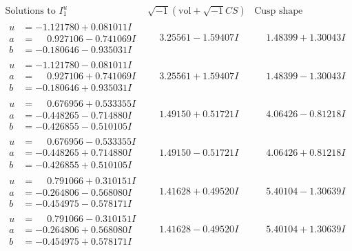 \documentclass[1p]{elsarticle_modified}
\theoremstyle{definition}
\newcommand{\I}{\sqrt{-1}}
\begin{document}
$$\begin{array}{c|c|c}  
\text{Solutions to }I^u_{1}& \I (\text{vol} + \sqrt{-1}CS) & \text{Cusp shape}\\
 \hline 
\begin{aligned}
u &= -1.121780 + 0.081011 I \\
a &= \phantom{-}0.927106 - 0.741069 I \\
b &= -0.180646 - 0.935031 I\end{aligned}
 & \phantom{-}3.25561 - 1.59407 I & \phantom{-}1.48399 + 1.30043 I \\ \hline\begin{aligned}
u &= -1.121780 - 0.081011 I \\
a &= \phantom{-}0.927106 + 0.741069 I \\
b &= -0.180646 + 0.935031 I\end{aligned}
 & \phantom{-}3.25561 + 1.59407 I & \phantom{-}1.48399 - 1.30043 I \\ \hline\begin{aligned}
u &= \phantom{-}0.676956 + 0.533355 I \\
a &= -0.448265 - 0.714880 I \\
b &= -0.426855 - 0.510105 I\end{aligned}
 & \phantom{-}1.49150 + 0.51721 I & \phantom{-}4.06426 - 0.81218 I \\ \hline\begin{aligned}
u &= \phantom{-}0.676956 - 0.533355 I \\
a &= -0.448265 + 0.714880 I \\
b &= -0.426855 + 0.510105 I\end{aligned}
 & \phantom{-}1.49150 - 0.51721 I & \phantom{-}4.06426 + 0.81218 I \\ \hline\begin{aligned}
u &= \phantom{-}0.791066 + 0.310151 I \\
a &= -0.264806 - 0.568080 I \\
b &= -0.454975 - 0.578171 I\end{aligned}
 & \phantom{-}1.41628 + 0.49520 I & \phantom{-}5.40104 - 1.30639 I \\ \hline\begin{aligned}
u &= \phantom{-}0.791066 - 0.310151 I \\
a &= -0.264806 + 0.568080 I \\
b &= -0.454975 + 0.578171 I\end{aligned}
 & \phantom{-}1.41628 - 0.49520 I & \phantom{-}5.40104 + 1.30639 I \\ \hline\begin{aligned}

\end{aligned}
\end{array}$$
\end{document}

